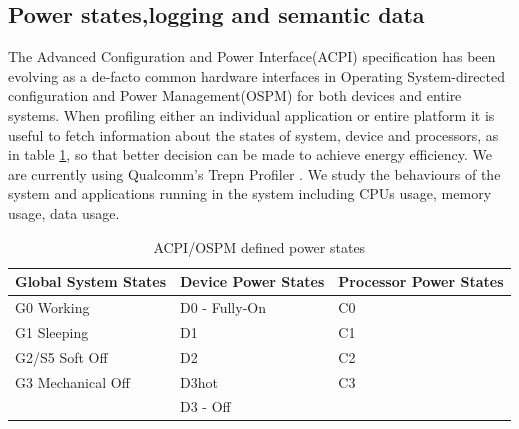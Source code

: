 \subsection{Power states,logging and semantic data}
The Advanced Configuration and Power Interface(ACPI) specification has been evolving as a de-facto common hardware interfaces in Operating System-directed configuration and  Power Management(OSPM) for both devices and entire systems. When profiling either an individual application or entire platform it is useful to fetch information about the states of system, device and processors, as in table \ref{table:states}, so that better decision can be made to achieve energy efficiency. We are currently using Qualcomm's Trepn Profiler \cite{trepn}. We study the behaviours of the system and applications running in the system including CPUs usage, memory usage, data usage. 
\begin{table}[h]
\begin{tabular}{|l|l|l|}
\hline
Global System States & Device Power States  & Processor Power States \\
\hline
G0 Working & D0 - Fully-On  & C0\\
G1 Sleeping & D1  & C1\\
G2/S5 Soft Off & D2 & C2\\
G3 Mechanical Off & D3hot & C3\\
& D3 - Off & \\
\hline
\end{tabular}
\caption{ACPI/OSPM defined power states}
\label{table:states}
\end{table}


